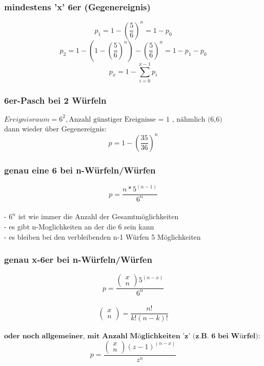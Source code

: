 \documentclass{article}
\begin{document}
	\subsubsection{mindestens 'x' 6er (Gegenereignis)}
	\[	
	p_1 = 1 - \left( \frac{5}{6} \right)^n = 1 - p_0
	\]	
	\[		
	p_2 = 1-\left(1 - \left( \frac{5}{6} \right)^n\right)-\left( \frac{5}{6} \right)^n = 1-p_1 -p_0
	\]
	\[
	p_x = 1 - \sum_{i=0}^{x-1} p_i
	\]
	\subsubsection{6er-Pasch bei 2 Würfeln}
	$Ereignisraum = 6^2 , \text{Anzahl günstiger Ereignisse = 1 , nähmlich (6,6)}$\\
	dann wieder über Gegenereignis: \\
	\[ p=1-\left(\frac{35}{36}\right)^n \]
	\subsubsection{genau eine 6 bei n-Würfeln/Würfen}
	\[ p= \frac{n*5^{(n-1)}}{6^n}\]\\
	- $6^n $ ist wie immer die Anzahl der Gesamtmöglichkeiten \\
	- es gibt n-Moglichkeiten an der die 6 sein kann \\
	- es bleiben bei den verbleibenden n-1 Würfen 5 Möglichkeiten
	\subsubsection{genau x-6er bei n-Würfeln/Würfen}
	\[ p= \frac{\begin{pmatrix}
		x\\n
		\end{pmatrix}5^{(n-x)}}{6^n}\]\\
	\[\begin{pmatrix}
	x\\n
	\end{pmatrix}= \frac{n!}{k!(n-k)!}
	\]\\
	$\textbf{oder noch allgemeiner, mit Anzahl Möglichkeiten 'z' (z.B. 6 bei Würfel):}$\[
	p= \frac{\begin{pmatrix}
		x\\n
		\end{pmatrix}(z-1)^{(n-x)}}{z^n}
	\]
\end{document}
